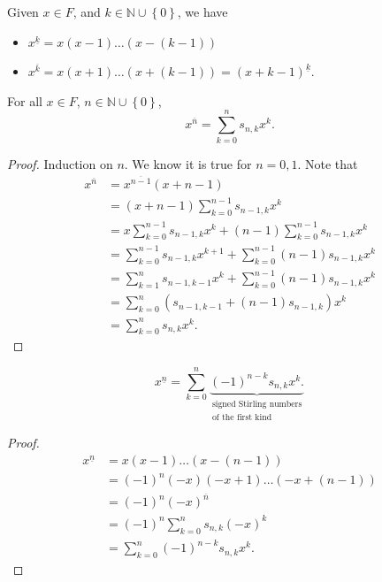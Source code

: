 \begin{notation}
    Given \(x \in F\), and \(k \in \mathbb{N} \cup \left\{ 0 \right\} \), we have 
    \begin{itemize}
        \item \(x^{\underline{k}} = x(x-1)\dots (x-(k-1))\) 
        \item \(x^{\overline{k} } = x(x+1)\dots (x+(k-1)) = (x+k-1)^{\underline{k}}\).  
    \end{itemize}
\end{notation}

\begin{proposition} \label{prop: a summation formula for first kind of striling number}
    For all \(x \in F\), \(n \in \mathbb{N} \cup \left\{ 0 \right\} \), 
    \[
        x^{\overline{n} }= \sum_{k=0}^n s_{n,k} x^k. 
    \]  
\end{proposition}
\begin{proof}
    Induction on \(n\). We know it is true for \(n=0,1\). Note that 
    \begin{align*}
        x^{\overline{n} } &= x^{\overline{n-1}}(x+n-1) \\
        &= (x+n-1) \sum_{k=0}^{n-1} s_{n-1,k} x^k \\
        &= x \sum_{k=0}^{n-1}s_{n-1,k} x^k + (n-1) \sum_{k=0}^{n-1} s_{n-1, k} x^k \\
        &= \sum_{k=0}^{n-1} s_{n-1,k} x^{k+1} + \sum_{k=0}^{n-1}(n-1)s_{n-1,k}x^k \\
        &= \sum_{k=1}^n s_{n-1, k-1} x^{k} + \sum_{k=0}^{n-1}(n-1)s_{n-1,k}x^k \\
        &= \sum_{k=0}^n \left( s_{n-1,k-1}+(n-1)s_{n-1,k} \right) x^k \\
        &= \sum_{k=0}^n s_{n,k} x^k.          
    \end{align*} 
\end{proof}

\begin{corollary}
    \[
         x^{\underline{n}} = \sum_{k=0}^n \underbrace{(-1)^{n-k} s_{n,k} x^k .}_{\substack{\text{signed Stirling numbers} \\ \text{of the first kind}}}
    \]
\end{corollary}
\begin{proof}
    \begin{align*}
        x^{\underline{n}} &= x(x-1)\dots (x-(n-1)) \\
        &= (-1)^n (-x)(-x+1)\dots (-x+(n-1)) \\
        &=(-1)^n (-x)^{\overline{n} } \\
        &= (-1)^n \sum_{k=0}^n s_{n,k}(-x)^k \\
        &= \sum_{k=0}^n (-1)^{n-k} s_{n,k} x^k. 
    \end{align*}
\end{proof}